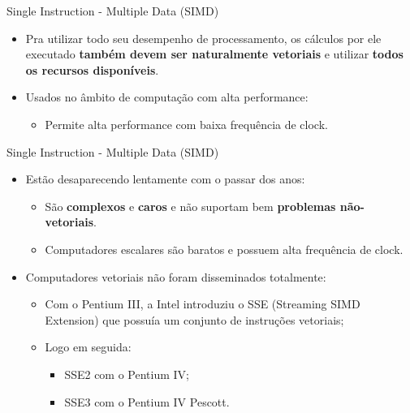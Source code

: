 \begin{frame}{Single Instruction - Multiple Data (SIMD)}
	\begin{itemize}
		\item Pra utilizar todo seu desempenho de processamento, os cálculos por ele executado \textbf{também devem ser naturalmente vetoriais} e utilizar \textbf{todos os recursos disponíveis}.
		\item Usados no âmbito de computação com alta performance:
		\begin{itemize}
			\item Permite alta performance com baixa frequência de clock.
		\end{itemize}

	\end{itemize}

\end{frame}


\begin{frame}{Single Instruction - Multiple Data (SIMD)}
	\begin{itemize}
		\item Estão desaparecendo lentamente com o passar dos anos:
		\begin{itemize}
			\item São \textbf{complexos} e \textbf{caros} e não suportam bem \textbf{problemas não-vetoriais}.
		    \item Computadores escalares são baratos e possuem alta frequência de clock.
		\end{itemize}

		\item Computadores vetoriais não foram disseminados totalmente:
		\begin{itemize}
			\item Com o Pentium III, a Intel introduziu o SSE (Streaming SIMD Extension) que possuía um conjunto de instruções vetoriais;
			\item Logo em seguida:
			\begin{itemize}
			    \item SSE2 com o Pentium IV;
			    \item SSE3 com o Pentium IV Pescott.
			\end{itemize}

		\end{itemize}

	\end{itemize}

\end{frame}







